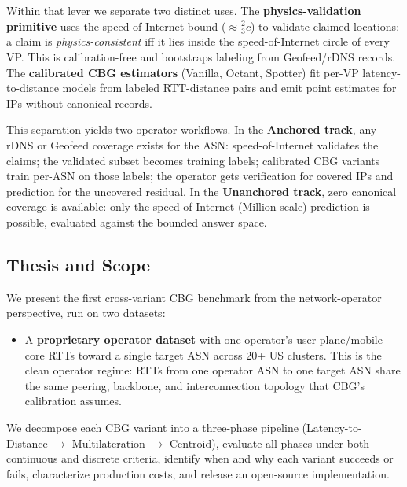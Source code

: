 Within that lever we separate two distinct uses. The \textbf{physics-validation primitive} uses
the speed-of-Internet bound ($\approx \tfrac{2}{3}c$) to validate claimed locations: a claim is
\emph{physics-consistent} iff it lies inside the speed-of-Internet circle of every VP. This is
calibration-free and bootstraps labeling from Geofeed/rDNS records. The \textbf{calibrated CBG
estimators} (Vanilla, Octant, Spotter) fit per-VP latency-to-distance models from labeled
RTT-distance pairs and emit point estimates for IPs without canonical records.

This separation yields two operator workflows. In the \textbf{Anchored track}, any rDNS or
Geofeed coverage exists for the ASN: speed-of-Internet validates the claims; the validated subset
becomes training labels; calibrated CBG variants train per-ASN on those labels; the operator gets
verification for covered IPs and prediction for the uncovered residual. In the
\textbf{Unanchored track}, zero canonical coverage is available: only the speed-of-Internet
(Million-scale) prediction is possible, evaluated against the bounded answer space.

\subsection{Thesis and Scope}
\label{sec:intro-thesis}

We present the first cross-variant CBG benchmark from the network-operator perspective, run on
two datasets:

\begin{itemize}[leftmargin=*]
    AWS~(AS16509, 30\,VPs globally), AT\&T~(AS7018, 125\,US VPs), Vodafone~DE~(AS3209,
    164\,EU VPs)---against 713 RIPE Atlas anchors. This dataset is reproducible and serves as
    the public stress test.
  \item A \textbf{proprietary operator dataset} with one operator's user-plane/mobile-core RTTs
    toward a single target ASN across 20+ US clusters. This is the clean operator regime: RTTs
    from one operator ASN to one target ASN share the same peering, backbone, and interconnection
    topology that CBG's calibration assumes.
\end{itemize}

We decompose each CBG variant into a three-phase pipeline (Latency-to-Distance $\to$
Multilateration $\to$ Centroid), evaluate all phases under both continuous and discrete criteria,
identify when and why each variant succeeds or fails, characterize production costs, and release
an open-source implementation.


